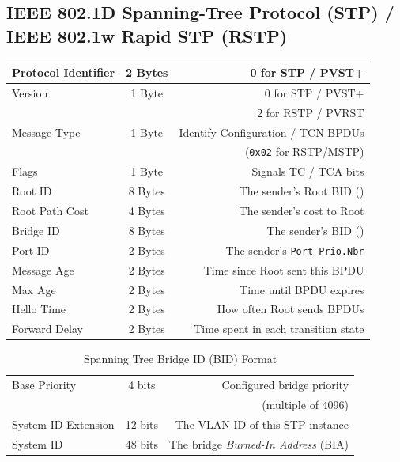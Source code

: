 \documentclass[12pt]{article}
\begin{document}
	\subsection[IEEE 802.1D STP / IEEE 802.1w RSTP]{IEEE 802.1D Spanning-Tree Protocol (STP) /\\IEEE 802.1w Rapid STP (RSTP) \label{subsec:802.1D/w}}
	\begin{table}[H]
	\centering
	\begin{tabular}{| l | c | r |}
	\hline
	Protocol Identifier		& 2 Bytes	& 0 for STP / PVST+\\\hline
	Version			& 1 Byte	& 0 for STP / PVST+\\
					&		& 2 for RSTP / PVRST\\\hline
	Message Type		& 1 Byte	& Identify Configuration / TCN BPDUs\\
					&		& (\texttt{0x02} for RSTP/MSTP)\\\hline
	Flags				& 1 Byte	& Signals TC / TCA bits\\\hline
	Root ID			& 8 Bytes	& The sender's Root BID (\Cref{tab:BID})\\\hline
	Root Path Cost		& 4 Bytes	& The sender's cost to Root\\\hline
	Bridge ID			& 8 Bytes	& The sender's BID (\Cref{tab:BID})\\\hline
	Port ID			& 2 Bytes	& The sender's \texttt{Port Prio.Nbr}\\\hline
	Message Age		& 2 Bytes	& Time since Root sent this BPDU\\\hline
	Max Age			& 2 Bytes	& Time until BPDU expires\\\hline
	Hello Time			& 2 Bytes	& How often Root sends BPDUs\\\hline
	Forward Delay		& 2 Bytes	& Time spent in each transition state\\\hline
	\end{tabular}\end{table}

	\begin{table}[H]
	\centering
	\caption{Spanning Tree Bridge ID (BID) Format \label{tab:BID}}
	\begin{tabular}{| l | c | r |}
	\hline
	Base Priority		& 4 bits	& Configured bridge priority\\
					&		& (multiple of 4096)\\\hline
	System ID Extension	& 12 bits	& The VLAN ID of this STP instance\\\hline
	System ID			& 48 bits	& The bridge \textit{Burned-In Address} (BIA)\\\hline
	\end{tabular}\end{table}
\end{document}
